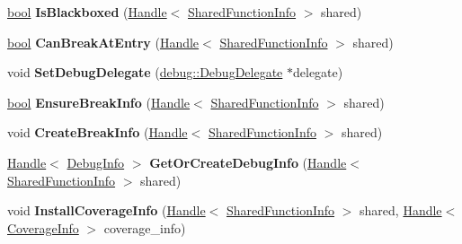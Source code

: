 \begin{DoxyCompactItemize}
\mbox{\hyperlink{classbool}{bool}} {\bfseries Is\+Blackboxed} (\mbox{\hyperlink{classv8_1_1internal_1_1Handle}{Handle}}$<$ \mbox{\hyperlink{classv8_1_1internal_1_1SharedFunctionInfo}{Shared\+Function\+Info}} $>$ shared)
\item 
\mbox{\label{classv8_1_1internal_1_1Debug_a366a3808bc1692593cd711b610b3a653}} 
\mbox{\hyperlink{classbool}{bool}} {\bfseries Can\+Break\+At\+Entry} (\mbox{\hyperlink{classv8_1_1internal_1_1Handle}{Handle}}$<$ \mbox{\hyperlink{classv8_1_1internal_1_1SharedFunctionInfo}{Shared\+Function\+Info}} $>$ shared)
\item 
\mbox{\label{classv8_1_1internal_1_1Debug_a0be2b8ee919677a9d67f598d5c22a7b0}} 
void {\bfseries Set\+Debug\+Delegate} (\mbox{\hyperlink{classv8_1_1debug_1_1DebugDelegate}{debug\+::\+Debug\+Delegate}} $\ast$delegate)
\item 
\mbox{\label{classv8_1_1internal_1_1Debug_aac4a3b8ed0aa454f151186075c7bd445}} 
\mbox{\hyperlink{classbool}{bool}} {\bfseries Ensure\+Break\+Info} (\mbox{\hyperlink{classv8_1_1internal_1_1Handle}{Handle}}$<$ \mbox{\hyperlink{classv8_1_1internal_1_1SharedFunctionInfo}{Shared\+Function\+Info}} $>$ shared)
\item 
\mbox{\label{classv8_1_1internal_1_1Debug_a90db8b5004a2dadd3d39eb9f18dd10c4}} 
void {\bfseries Create\+Break\+Info} (\mbox{\hyperlink{classv8_1_1internal_1_1Handle}{Handle}}$<$ \mbox{\hyperlink{classv8_1_1internal_1_1SharedFunctionInfo}{Shared\+Function\+Info}} $>$ shared)
\item 
\mbox{\label{classv8_1_1internal_1_1Debug_af81b32983e5efaa82aec515f2ca0e6e0}} 
\mbox{\hyperlink{classv8_1_1internal_1_1Handle}{Handle}}$<$ \mbox{\hyperlink{classv8_1_1internal_1_1DebugInfo}{Debug\+Info}} $>$ {\bfseries Get\+Or\+Create\+Debug\+Info} (\mbox{\hyperlink{classv8_1_1internal_1_1Handle}{Handle}}$<$ \mbox{\hyperlink{classv8_1_1internal_1_1SharedFunctionInfo}{Shared\+Function\+Info}} $>$ shared)
\item 
\mbox{\label{classv8_1_1internal_1_1Debug_a639346a4016ddc3fcccedf7e1a590164}} 
void {\bfseries Install\+Coverage\+Info} (\mbox{\hyperlink{classv8_1_1internal_1_1Handle}{Handle}}$<$ \mbox{\hyperlink{classv8_1_1internal_1_1SharedFunctionInfo}{Shared\+Function\+Info}} $>$ shared, \mbox{\hyperlink{classv8_1_1internal_1_1Handle}{Handle}}$<$ \mbox{\hyperlink{classv8_1_1internal_1_1CoverageInfo}{Coverage\+Info}} $>$ coverage\+\_\+info)

\end{DoxyCompactItemize}
